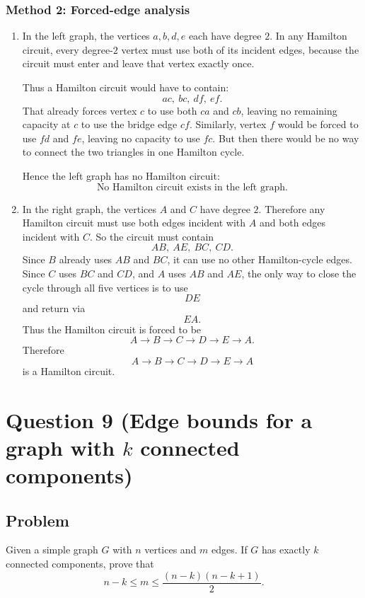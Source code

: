 \documentclass[12pt]{article}
\begin{document}
\subsubsection{Method 2: Forced-edge analysis}
\begin{enumerate}[label=(\alph*)]
\item In the left graph, the vertices \(a,b,d,e\) each have degree \(2\). In any Hamilton circuit, every degree-\(2\) vertex must use both of its incident edges, because the circuit must enter and leave that vertex exactly once.

Thus a Hamilton circuit would have to contain:
\[
ac,\ bc,\ df,\ ef.
\]
That already forces vertex \(c\) to use both \(ca\) and \(cb\), leaving no remaining capacity at \(c\) to use the bridge edge \(cf\). Similarly, vertex \(f\) would be forced to use \(fd\) and \(fe\), leaving no capacity to use \(fc\). But then there would be no way to connect the two triangles in one Hamilton cycle.

Hence the left graph has no Hamilton circuit:
\[
\boxed{\text{No Hamilton circuit exists in the left graph.}}
\]

\item In the right graph, the vertices \(A\) and \(C\) have degree \(2\). Therefore any Hamilton circuit must use both edges incident with \(A\) and both edges incident with \(C\). So the circuit must contain
\[
AB,\ AE,\ BC,\ CD.
\]
Since \(B\) already uses \(AB\) and \(BC\), it can use no other Hamilton-cycle edges. Since \(C\) uses \(BC\) and \(CD\), and \(A\) uses \(AB\) and \(AE\), the only way to close the cycle through all five vertices is to use
\[
DE
\]
and return via
\[
EA.
\]
Thus the Hamilton circuit is forced to be
\[
A\to B\to C\to D\to E\to A.
\]
Therefore
\[
\boxed{A\to B\to C\to D\to E\to A}
\]
is a Hamilton circuit.
\end{enumerate}

\newpage

\section{Question 9 (Edge bounds for a graph with \(k\) connected components)}

\subsection{Problem}
Given a simple graph \(G\) with \(n\) vertices and \(m\) edges. If \(G\) has exactly \(k\) connected components, prove that
\[
n-k \le m \le \frac{(n-k)(n-k+1)}{2}.
\]
\end{document}
